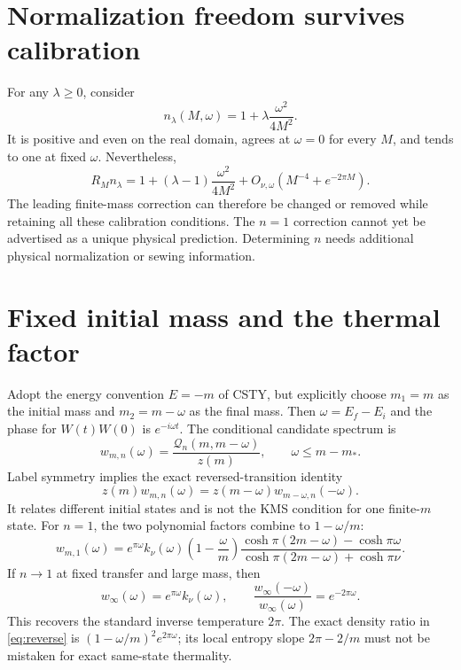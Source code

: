 \documentclass[11pt,a4paper]{article}
\newcommand{\Q}{\mathcal Q}
\begin{document}
\section{Normalization freedom survives calibration}
For any \(\lambda\ge0\), consider
\begin{equation}
n_\lambda(M,\omega)=1+\lambda\frac{\omega^2}{4M^2}.
\end{equation}
It is positive and even on the real domain, agrees at \(\omega=0\)
for every \(M\), and tends to one at fixed \(\omega\).
Nevertheless,
\begin{equation}
R_M n_\lambda
=1+(\lambda-1)\frac{\omega^2}{4M^2}
+O_{\nu,\omega}(M^{-4}+e^{-2\pi M}).
\label{eq:freedom}
\end{equation}
The leading finite-mass correction can therefore be changed or
removed while retaining all these calibration conditions.
The \(n=1\) correction cannot yet be advertised as a unique
physical prediction. Determining \(n\) needs additional physical
normalization or sewing information.

\section{Fixed initial mass and the thermal factor}
Adopt the energy convention \(E=-m\) of CSTY, but explicitly
choose \(m_1=m\) as the initial mass and \(m_2=m-\omega\) as the
final mass. Then \(\omega=E_f-E_i\) and the phase for
\(W(t)W(0)\) is \(e^{-i\omega t}\).
The conditional candidate spectrum is
\begin{equation}
w_{m,n}(\omega)=\frac{\Q_n(m,m-\omega)}{z(m)},
\qquad \omega\le m-m_* .
\end{equation}
Label symmetry implies the exact reversed-transition identity
\begin{equation}
z(m)w_{m,n}(\omega)
=z(m-\omega)w_{m-\omega,n}(-\omega).
\label{eq:reverse}
\end{equation}
It relates different initial states and is not the KMS condition
for one finite-\(m\) state.
For \(n=1\), the two polynomial factors combine to \(1-\omega/m\):
\begin{equation}
w_{m,1}(\omega)=e^{\pi\omega}k_\nu(\omega)
\left(1-\frac{\omega}{m}\right)
\frac{\cosh\pi(2m-\omega)-\cosh\pi\omega}
{\cosh\pi(2m-\omega)+\cosh\pi\nu}.\label{eq:initial}
\end{equation}
If \(n\to1\) at fixed transfer and large mass, then
\begin{equation}
w_\infty(\omega)=e^{\pi\omega}k_\nu(\omega),\qquad
\frac{w_\infty(-\omega)}{w_\infty(\omega)}=e^{-2\pi\omega}.
\label{eq:kms}
\end{equation}
This recovers the standard inverse temperature \(2\pi\).
The exact density ratio in \eqref{eq:reverse} is
\((1-\omega/m)^2e^{2\pi\omega}\); its local entropy slope
\(2\pi-2/m\) must not be mistaken for exact same-state thermality.
\end{document}

